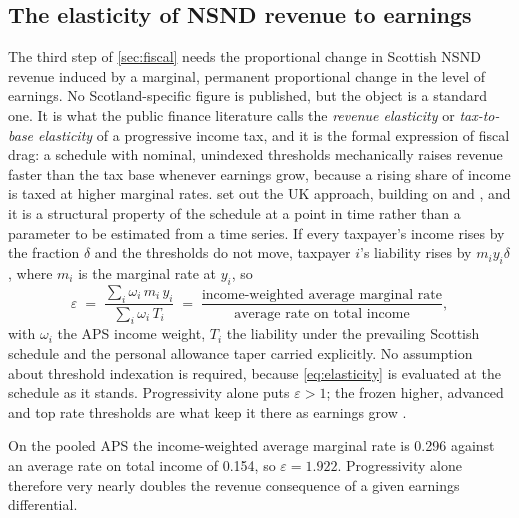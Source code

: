 \subsection{The elasticity of NSND revenue to earnings}\label{app:elasticity}

The third step of \cref{sec:fiscal} needs the proportional change in Scottish NSND revenue induced by a marginal, permanent proportional change in the level of earnings. No Scotland-specific figure is published, but the object is a standard one. It is what the public finance literature calls the \emph{revenue elasticity} or \emph{tax-to-base elasticity} of a progressive income tax, and it is the formal expression of fiscal drag: a schedule with nominal, unindexed thresholds mechanically raises revenue faster than the tax base whenever earnings grow, because a rising share of income is taxed at higher marginal rates. \citet{creedy2004} set out the UK approach, building on \citet{creedy2002} and \citet{johnson1989}, and it is a structural property of the schedule at a point in time rather than a parameter to be estimated from a time series. If every taxpayer's income rises by the fraction $\delta$ and the thresholds do not move, taxpayer $i$'s liability rises by $m_i y_i \delta$, where $m_i$ is the marginal rate at $y_i$, so
\begin{equation}\label{eq:elasticity}
\varepsilon \;=\;
\frac{\sum_i \omega_i\, m_i\, y_i}{\sum_i \omega_i\, T_i}
\;=\;
\frac{\text{income-weighted average marginal rate}}
     {\text{average rate on total income}},
\end{equation}
with $\omega_i$ the APS income weight, $T_i$ the liability under the prevailing Scottish schedule and the personal allowance taper carried explicitly. No assumption about threshold indexation is required, because \cref{eq:elasticity} is evaluated at the schedule as it stands. Progressivity alone puts $\varepsilon > 1$; the frozen higher, advanced and top rate thresholds are what keep it there as earnings grow \citep{sgreadyreckoner2026}.

On the pooled APS the income-weighted average marginal rate is 0.296 against an average rate on total income of 0.154, so $\varepsilon = 1.922$. Progressivity alone therefore very nearly doubles the revenue consequence of a given earnings differential.

